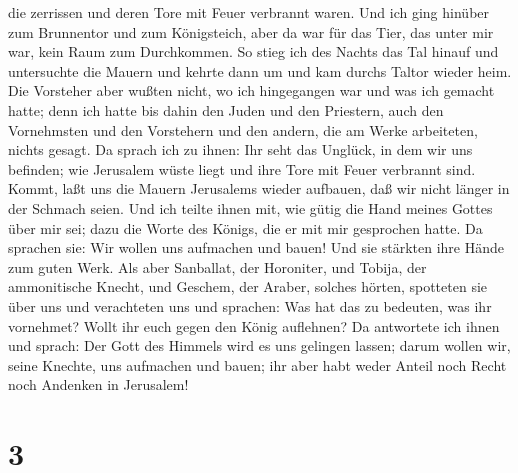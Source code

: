 die zerrissen und deren Tore mit Feuer verbrannt waren. 
Und ich ging hinüber zum Brunnentor und zum Königsteich, aber da war für
das Tier, das unter mir war, kein Raum zum Durchkommen. 
So stieg ich des Nachts das Tal hinauf und untersuchte die Mauern und
kehrte dann um und kam durchs Taltor wieder heim.  Die
Vorsteher aber wußten nicht, wo ich hingegangen war und was ich gemacht
hatte; denn ich hatte bis dahin den Juden und den Priestern, auch den
Vornehmsten und den Vorstehern und den andern, die am Werke arbeiteten,
nichts gesagt.  Da sprach ich zu ihnen: Ihr seht das
Unglück, in dem wir uns befinden; wie Jerusalem wüste liegt und ihre
Tore mit Feuer verbrannt sind. Kommt, laßt uns die Mauern Jerusalems
wieder aufbauen, daß wir nicht länger in der Schmach seien.
 Und ich teilte ihnen mit, wie gütig die Hand meines
Gottes über mir sei; dazu die Worte des Königs, die er mit mir
gesprochen hatte. Da sprachen sie: Wir wollen uns aufmachen und bauen!
Und sie stärkten ihre Hände zum guten Werk.  Als aber
Sanballat, der Horoniter, und Tobija, der ammonitische Knecht, und
Geschem, der Araber, solches hörten, spotteten sie über uns und
verachteten uns und sprachen: Was hat das zu bedeuten, was ihr
vornehmet? Wollt ihr euch gegen den König auflehnen?  Da
antwortete ich ihnen und sprach: Der Gott des Himmels wird es uns
gelingen lassen; darum wollen wir, seine Knechte, uns aufmachen und
bauen; ihr aber habt weder Anteil noch Recht noch Andenken in Jerusalem!

\hypertarget{section-2}{%
\section{3}\label{section-2}}

